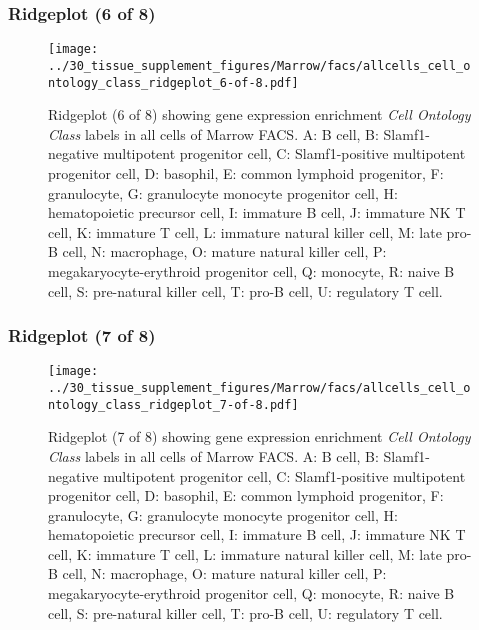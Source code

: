 \subsubsection{Ridgeplot (6 of 8)}
\begin{figure}[h]
\centering
\texttt{[image: ../30\_tissue\_supplement\_figures/Marrow/facs/allcells\_cell\_ontology\_class\_ridgeplot\_6-of-8.pdf]}

\caption{ Ridgeplot (6 of 8)  showing gene expression enrichment \emph{Cell Ontology Class} labels in all cells of Marrow FACS. A: B cell, B: Slamf1-negative multipotent progenitor cell, C: Slamf1-positive multipotent progenitor cell, D: basophil, E: common lymphoid progenitor, F: granulocyte, G: granulocyte monocyte progenitor cell, H: hematopoietic precursor cell, I: immature B cell, J: immature NK T cell, K: immature T cell, L: immature natural killer cell, M: late pro-B cell, N: macrophage, O: mature natural killer cell, P: megakaryocyte-erythroid progenitor cell, Q: monocyte, R: naive B cell, S: pre-natural killer cell, T: pro-B cell, U: regulatory T cell.}
\end{figure}


\clearpage

\subsubsection{Ridgeplot (7 of 8)}
\begin{figure}[h]
\centering
\texttt{[image: ../30\_tissue\_supplement\_figures/Marrow/facs/allcells\_cell\_ontology\_class\_ridgeplot\_7-of-8.pdf]}

\caption{ Ridgeplot (7 of 8)  showing gene expression enrichment \emph{Cell Ontology Class} labels in all cells of Marrow FACS. A: B cell, B: Slamf1-negative multipotent progenitor cell, C: Slamf1-positive multipotent progenitor cell, D: basophil, E: common lymphoid progenitor, F: granulocyte, G: granulocyte monocyte progenitor cell, H: hematopoietic precursor cell, I: immature B cell, J: immature NK T cell, K: immature T cell, L: immature natural killer cell, M: late pro-B cell, N: macrophage, O: mature natural killer cell, P: megakaryocyte-erythroid progenitor cell, Q: monocyte, R: naive B cell, S: pre-natural killer cell, T: pro-B cell, U: regulatory T cell.}
\end{figure}


\clearpage

